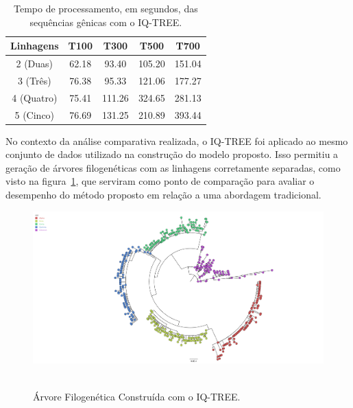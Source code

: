 \begin{table}[htb]
  \caption{Tempo de processamento, em segundos, das sequências gênicas com o IQ-TREE.}
  \begin{center}
    \begin{tabular}{c|c|c|c|c}
      \hline
      Linhagens  & T100  & T300   & T500   & T700   \\
      \hline
      2 (Duas)   & 62.18 & 93.40  & 105.20 & 151.04 \\
      3 (Três)   & 76.38 & 95.33  & 121.06 & 177.27 \\
      4 (Quatro) & 75.41 & 111.26 & 324.65 & 281.13 \\
      5 (Cinco)  & 76.69 & 131.25 & 210.89 & 393.44 \\
      \hline
    \end{tabular}
  \end{center}
  \label{tab:tempoProcessamentoIqtree}
\end{table}

No contexto da análise comparativa realizada, o IQ-TREE foi aplicado ao mesmo conjunto de dados utilizado na construção do modelo proposto. Isso permitiu a geração de árvores filogenéticas com as linhagens corretamente separadas, como visto na figura~\ref{fig:arvoreIqtree}, que serviram como ponto de comparação para avaliar o desempenho do método proposto em relação a uma abordagem tradicional.

\begin{figure}[htb]
  \centering
  \caption{Árvore Filogenética Construída com o IQ-TREE.}
  \includegraphics[scale=0.2]{figuras/filogenia_tradicional/sequencias_treinamento.fasta.treefile.pdf}
  ~\label{fig:arvoreIqtree}
\end{figure}

